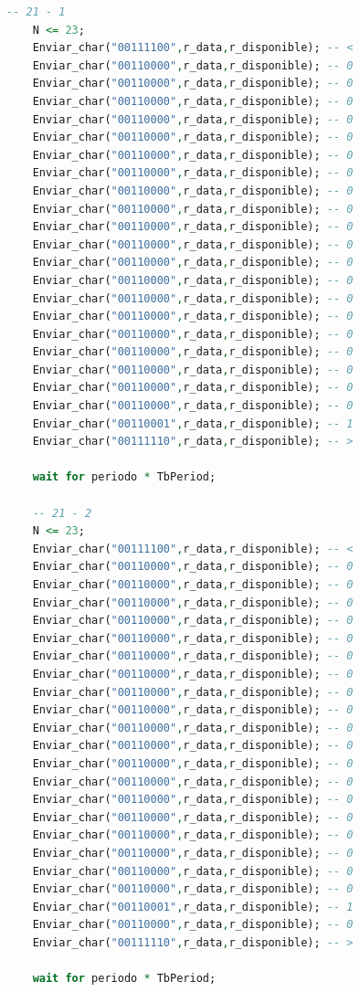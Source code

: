 \begin{lstlisting}[language = vhdl,caption=Testbench del módulo enclavamiento,label={lst:test_separador}]
	-- 21 - 1
	N <= 23; 	
	Enviar_char("00111100",r_data,r_disponible); -- < 	
	Enviar_char("00110000",r_data,r_disponible); -- 0 	
	Enviar_char("00110000",r_data,r_disponible); -- 0
 	Enviar_char("00110000",r_data,r_disponible); -- 0 	
	Enviar_char("00110000",r_data,r_disponible); -- 0
	Enviar_char("00110000",r_data,r_disponible); -- 0 	
	Enviar_char("00110000",r_data,r_disponible); -- 0
	Enviar_char("00110000",r_data,r_disponible); -- 0 	
	Enviar_char("00110000",r_data,r_disponible); -- 0
	Enviar_char("00110000",r_data,r_disponible); -- 0 	
	Enviar_char("00110000",r_data,r_disponible); -- 0
	Enviar_char("00110000",r_data,r_disponible); -- 0 	
	Enviar_char("00110000",r_data,r_disponible); -- 0
	Enviar_char("00110000",r_data,r_disponible); -- 0 	
	Enviar_char("00110000",r_data,r_disponible); -- 0
	Enviar_char("00110000",r_data,r_disponible); -- 0 	
	Enviar_char("00110000",r_data,r_disponible); -- 0
	Enviar_char("00110000",r_data,r_disponible); -- 0 	
	Enviar_char("00110000",r_data,r_disponible); -- 0
	Enviar_char("00110000",r_data,r_disponible); -- 0 	
	Enviar_char("00110000",r_data,r_disponible); -- 0
	Enviar_char("00110001",r_data,r_disponible); -- 1 	
	Enviar_char("00111110",r_data,r_disponible); -- >

	wait for periodo * TbPeriod;

	-- 21 - 2
	N <= 23; 	
	Enviar_char("00111100",r_data,r_disponible); -- < 	
	Enviar_char("00110000",r_data,r_disponible); -- 0 	
	Enviar_char("00110000",r_data,r_disponible); -- 0
 	Enviar_char("00110000",r_data,r_disponible); -- 0 	
	Enviar_char("00110000",r_data,r_disponible); -- 0
	Enviar_char("00110000",r_data,r_disponible); -- 0 	
	Enviar_char("00110000",r_data,r_disponible); -- 0
	Enviar_char("00110000",r_data,r_disponible); -- 0 	
	Enviar_char("00110000",r_data,r_disponible); -- 0
	Enviar_char("00110000",r_data,r_disponible); -- 0 	
	Enviar_char("00110000",r_data,r_disponible); -- 0
	Enviar_char("00110000",r_data,r_disponible); -- 0 	
	Enviar_char("00110000",r_data,r_disponible); -- 0
	Enviar_char("00110000",r_data,r_disponible); -- 0 	
	Enviar_char("00110000",r_data,r_disponible); -- 0
	Enviar_char("00110000",r_data,r_disponible); -- 0 	
	Enviar_char("00110000",r_data,r_disponible); -- 0
	Enviar_char("00110000",r_data,r_disponible); -- 0 	
	Enviar_char("00110000",r_data,r_disponible); -- 0
	Enviar_char("00110000",r_data,r_disponible); -- 0 	
	Enviar_char("00110001",r_data,r_disponible); -- 1
	Enviar_char("00110000",r_data,r_disponible); -- 0 	
	Enviar_char("00111110",r_data,r_disponible); -- >

	wait for periodo * TbPeriod;


\end{lstlisting}
